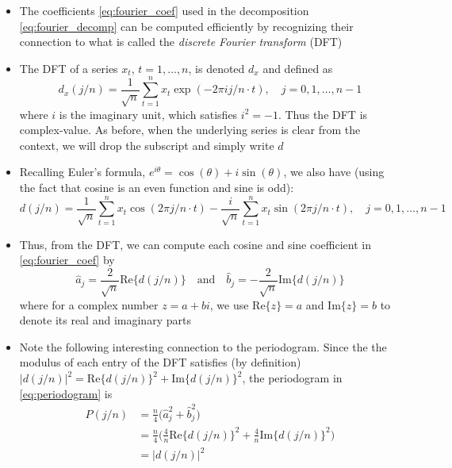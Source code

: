 \documentclass{article}
\begin{document}
\begin{itemize}
\item The coefficients \eqref{eq:fourier_coef} used in the decomposition
  \eqref{eq:fourier_decomp} can be computed efficiently by recognizing their
  connection to what is called the \emph{discrete Fourier transform} (DFT) 

\item The DFT of a series $x_t$, $t = 1,\dots,n$, is denoted $d_x$ and defined
  as  
  \begin{equation}
  \label{eq:dft}
  d_x(j/n) = \frac{1}{\sqrt{n}} \sum_{t=1}^n x_t \exp(-2\pi i j/n \cdot t), 
  \quad j = 0,1,\dots,n-1 
  \end{equation}
  where $i$ is the imaginary unit, which satisfies $i^2 = -1$. Thus the DFT is
  complex-value. As before, when the underlying series is clear from the
  context, we will drop the subscript and simply write $d$ 

\item Recalling Euler's formula, $e^{i\theta} = \cos(\theta) + i \sin(\theta)$, 
  we also have (using the fact that cosine is an even function and sine is odd): 
  \[
  d(j/n) = \frac{1}{\sqrt{n}} \sum_{t=1}^n x_t \cos(2\pi j/n \cdot t) - 
  \frac{i}{\sqrt{n}} \sum_{t=1}^n x_t \sin(2\pi j/n \cdot t), \quad j =
  0,1,\dots,n-1   
  \]

\item Thus, from the DFT, we can compute each cosine and sine coefficient in
  \eqref{eq:fourier_coef} by
  \[
  \hat{a}_j = \frac{2}{\sqrt{n}} \mathrm{Re}\{d(j/n)\} \quad \text{and} \quad 
  \hat{b}_j = -\frac{2}{\sqrt{n}} \mathrm{Im}\{d(j/n)\}
  \]
  where for a complex number $z = a+bi$, we use $\mathrm{Re}\{z\} = a$ and
  $\mathrm{Im}\{z\} = b$ to denote its real and imaginary parts

\item Note the following interesting connection to the periodogram. Since the
  the modulus of each entry of the DFT satisfies (by definition) $|d(j/n)|^2 = 
  \mathrm{Re}\{d(j/n)\}^2 + \mathrm{Im}\{d(j/n)\}^2$, the periodogram in
  \eqref{eq:periodogram} is 
  \begin{align}
  \nonumber
  P(j/n) &= \frac{n}{4} \big( \hat{a}_j^2 + \hat{b}_j^2 \big) \\
  \nonumber
  &= \frac{n}{4} \bigg( \frac{4}{n} \mathrm{Re}\{d(j/n)\}^2 +
    \frac{4}{n} \mathrm{Im}\{d(j/n)\}^2 \bigg) \\
  \label{eq:periodogram_dft}          
  &= |d(j/n)|^2
  \end{align}


\end{itemize}
\end{document}
